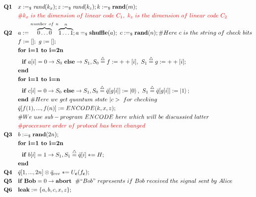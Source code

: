\documentclass{report}
\theoremstyle{defn_style}
\newcommand{\asteq}{\mathrel{*}=}
\begin{document}
\begin{tcolorbox}[colframe=black!75!black, colback=white, title=CSS Code Protocol: Quantum Language Representation]

\begin{align*}
    \textbf{Q1} \quad &  x :=_\$ \textit{rand}(k_x); z :=_\$ \textit{rand}(k_z);k :=_\$ \textbf{rand}(m);\\
    &\textcolor{red}{\#k_x ~is~ the~ dimension~ of~ linear~ code~ C_1,~k_z ~is~ the~ dimension~ of~ linear~ code~ C_2 }\\
    \textbf{Q2} \quad & a := \overset{number~of~n}{\overbrace{ 0\dots0}}\overset{n}{\overbrace{1\dots1}}; a =_\$ \textbf{shuffle}(a);~c:=_\$\textbf{rand}(n);\#Here~c~is~the~string~of~check~bits\\
    &f:=[];~g:=[];\\
    &\textbf{for~i=1~to~i=2n}\\
    &~~ \textbf{if }  a[i] = 0 \rightarrow S_0~\textbf{else}\rightarrow S_1 ,S_0\stackrel{\triangle}{=}f:=++[i],~S_1\stackrel{\triangle}{=}g:=++[i];\\
    &\textbf{end} \\
    &\textbf{for~i=1~to~i=n}\\
    &~~ \textbf{if }  c[i] = 0 \rightarrow S_0~\textbf{else}\rightarrow S_1 ,S_0\stackrel{\triangle}{=}\bar{q}[g[i]] := \ket{0},~S_1\stackrel{\triangle}{=}\bar{q}[g[i]] := \ket{1};\\
    &\textbf{end} ~\#Here~we~get~quantum~state~|c>~for~checking\\
    &\bar{q}[f(1),...,f(n)]:=ENCODE(k,x,z);\\
    &\#We~use~sub-program~ENCODE~here~which~will~be~discussied~latter\\
    &\textcolor{red}{\#proccesure~order~of~protocol~has~been~changed}\\
    \textbf{Q3} \quad & b :=_\$ \textbf{rand}(2n); \\ &\textbf{for~i=1~to~i=2n}\\
    &~~ \textbf{if }  b[i] = 1 \rightarrow S_1 ,S_1\stackrel{\triangle}{=}\bar{q}[i] \asteq H;\\
    &\textbf{end} \\
    \textbf{Q4} \quad & \bar{q}[1,...,2n]\otimes \bar{q}_{eve} \asteq U_{\textbf{c}}(f_{\textbf{c}}); \\
    \textbf{Q5} \quad 
    & \textbf{if }  \textbf{Bob} = 0 \rightarrow \textbf{abort} \;~\# ``Bob"~represents~if~Bob~received~the~signal~sent~by~Alice \\
    \textbf{Q6} \quad & \textbf{leak} := \{a, b, c, x, z\}; \\

\end{align*}
\end{tcolorbox}
\end{document}
